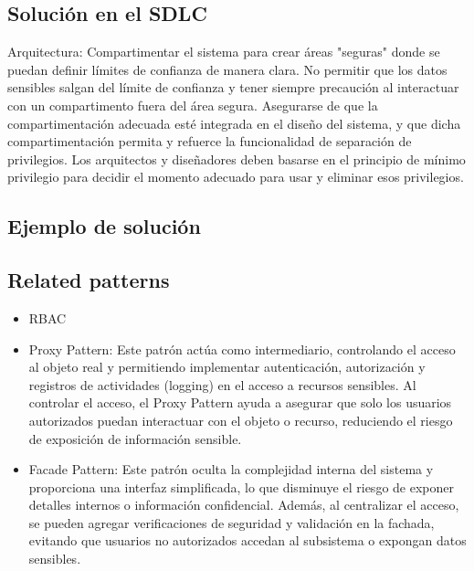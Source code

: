 \subsection*{Solución en el SDLC}
Arquitectura: Compartimentar el sistema para crear áreas "seguras" donde se puedan definir límites de confianza de manera clara. No permitir que los datos sensibles salgan del límite de confianza y tener siempre precaución al interactuar con un compartimento fuera del área segura.
Asegurarse de que la compartimentación adecuada esté integrada en el diseño del sistema, y que dicha compartimentación permita y refuerce la funcionalidad de separación de privilegios. Los arquitectos y diseñadores deben basarse en el principio de mínimo privilegio para decidir el momento adecuado para usar y eliminar esos privilegios.
\subsection*{Ejemplo de solución}
\subsection*{Related patterns}

\begin{itemize}
    \item RBAC
    \item Proxy Pattern: Este patrón actúa como intermediario, controlando el acceso al objeto real y permitiendo implementar autenticación, autorización y registros de actividades (logging) en el acceso a recursos sensibles. Al controlar el acceso, el Proxy Pattern ayuda a asegurar que solo los usuarios autorizados puedan interactuar con el objeto o recurso, reduciendo el riesgo de exposición de información sensible.
    \item Facade Pattern: Este patrón oculta la complejidad interna del sistema y proporciona una interfaz simplificada, lo que disminuye el riesgo de exponer detalles internos o información confidencial. Además, al centralizar el acceso, se pueden agregar verificaciones de seguridad y validación en la fachada, evitando que usuarios no autorizados accedan al subsistema o expongan datos sensibles.
\end{itemize}